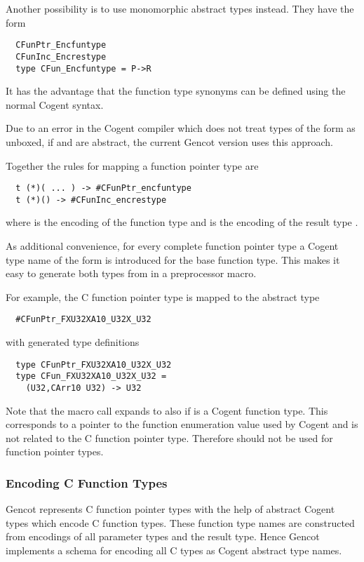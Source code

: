Another possibility is to use monomorphic abstract types instead. They have the form
\begin{verbatim}
  CFunPtr_Encfuntype
  CFunInc_Encrestype
  type CFun_Encfuntype = P->R
\end{verbatim}
It has the advantage that the function type synonyms can be defined using the normal Cogent syntax.

Due to an error in the Cogent compiler which does not treat types of the form  as unboxed, if 
and  are abstract, the current Gencot version uses this approach.

Together the rules for mapping a function pointer type are
\begin{verbatim}
  t (*)( ... ) -> #CFunPtr_encfuntype
  t (*)() -> #CFunInc_encrestype
\end{verbatim}
where  is the encoding of the function type  
and  is the encoding of the result type .

As additional convenience, for every complete function pointer type a Cogent type name of the form 
is introduced for the base function type. This makes it easy to generate both types from  in a preprocessor
macro.

For example, the C function pointer type  is mapped to the abstract type
\begin{verbatim}
  #CFunPtr_FXU32XA10_U32X_U32
\end{verbatim}
with generated type definitions
\begin{verbatim}
  type CFunPtr_FXU32XA10_U32X_U32
  type CFun_FXU32XA10_U32X_U32 =
    (U32,CArr10 U32) -> U32
\end{verbatim}

Note that the macro call  expands to  also if  is a Cogent function type.
This corresponds to a pointer to the function enumeration value used by Cogent and is not related to the C
function pointer type. Therefore  should not be used for function pointer types.

\subsubsection{Encoding C Function Types}

Gencot represents C function pointer types with the help of abstract Cogent types which encode C function types. These
function type names are constructed from encodings of all parameter types and the result type. Hence Gencot implements
a schema for encoding all C types as Cogent abstract type names.

